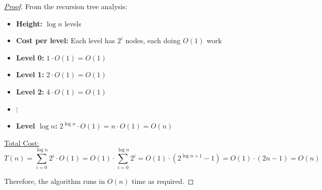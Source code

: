 \documentclass[11pt]{article}
\begin{document}
\begin{enumerate}
\begin{proof}[\underline{Proof}]
From the recursion tree analysis:
\begin{itemize}
    \item \textbf{Height:} $\log n$ levels
    \item \textbf{Cost per level:} Each level has $2^i$ nodes, each doing $O(1)$ work
    \item \textbf{Level 0:} $1 \cdot O(1) = O(1)$
    \item \textbf{Level 1:} $2 \cdot O(1) = O(1)$
    \item \textbf{Level 2:} $4 \cdot O(1) = O(1)$
    \item $\vdots$
    \item \textbf{Level $\log n$:} $2^{\log n} \cdot O(1) = n \cdot O(1) = O(n)$
\end{itemize}

\underline{Total Cost:} 
$$T(n) = \sum_{i=0}^{\log n} 2^i \cdot O(1) = O(1) \cdot \sum_{i=0}^{\log n} 2^i = O(1) \cdot (2^{\log n + 1} - 1) = O(1) \cdot (2n - 1) = O(n)$$

Therefore, the algorithm runs in $O(n)$ time as required.

\end{proof}

\end{enumerate}
\end{document}
